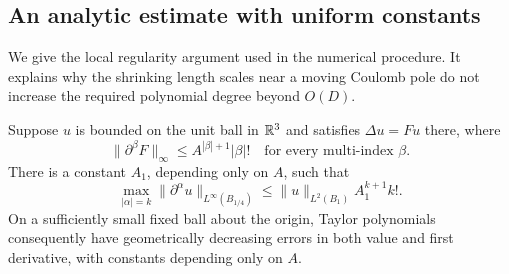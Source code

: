 \subsection{An analytic estimate with uniform constants}

We give the local regularity argument used in the numerical procedure.
It explains why the shrinking length scales near a moving Coulomb pole
do not increase the required polynomial degree beyond \(O(D)\).

\begin{lemma}
\label{lem:wells-analytic}
Suppose \(u\) is bounded on the unit ball in \(\mathbb R^3\) and satisfies
\(\Delta u=Fu\) there, where
\begin{equation}
 \|\partial^\beta F\|_\infty\le A^{|\beta|+1}|\beta|!
 \quad\text{for every multi-index }\beta.
 \label{eq:wells-analytic-coefficient}
\end{equation}
There is a constant \(A_1\), depending only on \(A\), such that
\begin{equation}
 \max_{|\alpha|=k}\|\partial^\alpha u\|_{L^\infty(B_{1/4})}
 \le \|u\|_{L^2(B_1)}A_1^{k+1}k!.
 \label{eq:wells-analytic-derivatives}
\end{equation}
On a sufficiently small fixed ball about the origin, Taylor
polynomials consequently have geometrically decreasing errors in
both value and first derivative, with constants depending only on \(A\).
\end{lemma}

